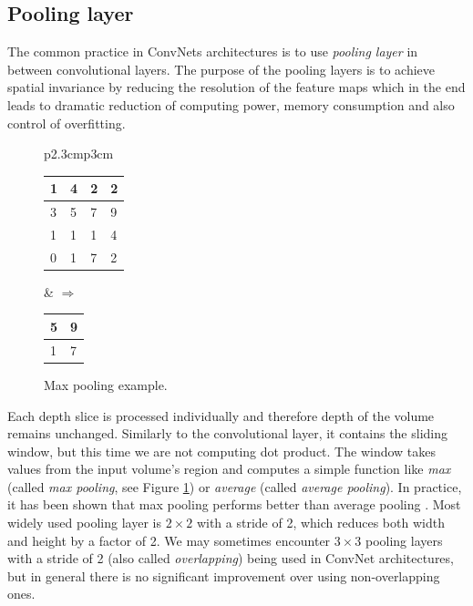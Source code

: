 \subsection{Pooling layer}
\label{sec:cnn:poollayer}

The common practice in ConvNets architectures is to use \textit{pooling layer} in between
convolutional layers. The purpose of the pooling layers is to achieve spatial invariance
by reducing the resolution of the feature maps 
which in the end leads to dramatic reduction of computing power, memory consumption and also
control of overfitting.

\begin{figure}[!h]
    \centering
    \begin{tabular}{p{2.3cm}p{3cm}}
        \begin{minipage}{.5\linewidth}
            \begin{tabular}{|l|l||l|l|}
                    \hline
                    1 & 4 & 2 & 2 \\ \hline
                    3 & 5 & 7 & 9 \\ \hline \hline
                    1 & 1 & 1 & 4 \\ \hline
                    0 & 1 & 7 & 2 \\ \hline
                \end{tabular}
        \end{minipage} &
        $\Rightarrow$
        \begin{minipage}{.5\linewidth}
            \begin{tabular}{|l||l|}
                    \hline
                    5 & 9  \\ \hline \hline
                    1 & 7  \\ \hline
                \end{tabular}
        \end{minipage} 
    \end{tabular}
    \caption[Max pooling example]{Max pooling example.}
    \label{img:maxpooling}
\end{figure}

Each depth slice is processed individually and therefore depth of the volume remains
unchanged. Similarly to the convolutional layer, it contains the sliding window, but this time
we are not computing dot product. The window takes values from the input volume's region
and computes a
simple function like \textit{max}
(called \textit{max pooling}, see Figure \ref{img:maxpooling}) or \textit{average}
(called \textit{average pooling}). In practice, it has been shown that max pooling performs
better than average pooling \cite{bib:scherer2010evaluation}.
Most widely used pooling layer is $2\times 2$ with a stride of
2, which reduces both width and height by a factor of 2. We may sometimes encounter
$3\times 3$ pooling layers with a stride of 2 (also called \textit{overlapping})
being used in ConvNet architectures, but in general there is
no significant improvement over using non-overlapping ones.
\cite{bib:cnncs231n, bib:scherer2010evaluation}\\


